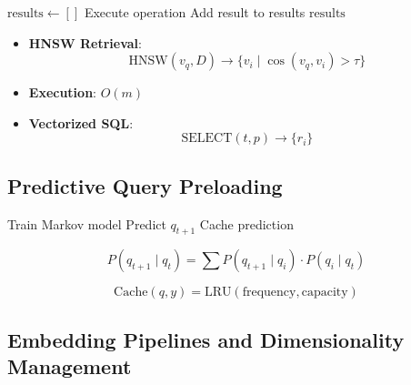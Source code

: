 \documentclass[11pt]{article}
\begin{document}
\begin{algorithm}
\caption{Vectorized Query Execution}
\label{alg:vectorized_execution}
\begin{algorithmic}[1]
    \State \( \text{results} \gets [] \)
            \State Execute operation
            \State Add result to results
        \EndIf
    \EndFor
    \State \Return \( \text{results} \)
\EndFunction
\end{algorithmic}
\end{algorithm}

\begin{itemize}
    \item \textbf{HNSW Retrieval}:
    \[
    \text{HNSW}(v_q, D) \rightarrow \{ v_i \mid \cos(v_q, v_i) > \tau \}
    \]
    \item \textbf{Execution}: \( O(m) \)
    \item \textbf{Vectorized SQL}:
    \[
    \text{SELECT}(t, p) \rightarrow \{ r_i \}
    \]
\end{itemize}

\subsection{Predictive Query Preloading}
\label{subsec:predictive_preloading}

\begin{algorithm}
\caption{Predictive Query Preloading}
\label{alg:predictive_preloading}
\begin{algorithmic}[1]
    \State Train Markov model
        \State Predict \( q_{t+1} \)
            \State Cache prediction
        \EndIf
    \EndFor
\EndFunction
\end{algorithmic}
\end{algorithm}

\[
P(q_{t+1} \mid q_t) = \sum P(q_{t+1} \mid q_i) \cdot P(q_i \mid q_t)
\]

\[
\text{Cache}(q, y) = \text{LRU}(\text{frequency}, \text{capacity})
\]

\subsection{Embedding Pipelines and Dimensionality Management}
\label{subsec:embedding_pipelines}
\end{document}
